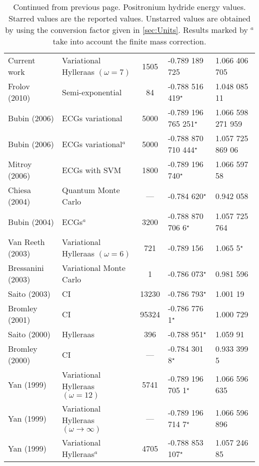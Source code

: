 \documentclass[Dissertation.tex]{subfiles}
\begin{document}
{\begin{center}
\begin{longtable}{l l c l l}
\caption[Positronium hydride energy values]{Continued from previous page. Positronium hydride energy values. Starred values are the reported values. Unstarred values are obtained by using the conversion factor given in \cref{sec:Units}. Results marked by $^a$ take into account the finite mass correction.}
\endlastfoot
\rowcolors{2}{gray!15}{white}
Current work & Variational Hylleraas $(\omega = 7)$ & 1505 & -0.789 189 725 & 1.066 406 705 \\
Frolov (2010) \cite{Frolov2010} & Semi-exponential & 84 & -0.788 516 419$^\star$ & 1.048 085 11 \\
Bubin (2006) \cite{Bubin2006} & ECGs variational & 5000 & -0.789 196 765 251$^\star$ & 1.066 598 271 959 \\
Bubin (2006) \cite{Bubin2006} & ECGs variational$^a$ & 5000 & -0.788 870 710 444$^\star$ & 1.057 725 869 06 \\
Mitroy (2006) \cite{Mitroy2006} & ECGs with SVM & 1800 & -0.789 196 740$^\star$ & 1.066 597 58 \\
Chiesa (2004) \cite{Chiesa2004} & Quantum Monte Carlo & --- & -0.784 620$^\star$ & 0.942 058 \\
Bubin (2004) \cite{Bubin2004} & ECGs$^a$ & 3200 & -0.788 870 706 6$^\star$ & 1.057 725 764 \\
Van Reeth (2003) \cite{VanReeth2003} & Variational Hylleraas $(\omega = 6)$ & 721 & -0.789 156 & 1.065 5$^\star$ \\
Bressanini (2003) \cite{Bressanini2003} & Variational Monte Carlo & 1 & -0.786 073$^\star$ & 0.981 596 \\
Saito (2003) \cite{Saito2003a} & CI & 13230 & -0.786 793$^\star$ & 1.001 19 \\
Bromley (2001) \cite{Bromley2001} & CI & 95324 & -0.786 776 1$^\star$ & 1.000 729 \\
Saito (2000) \cite{Saito2000} & Hylleraas & 396 & -0.788 951$^\star$ & 1.059 91 \\
Bromley (2000) \cite{Bromley2000} & CI & --- & -0.784 301 8$^\star$ & 0.933 399 5 \\
Yan (1999) \cite{Yan1999} & Variational Hylleraas $(\omega = 12)$ & 5741 & -0.789 196 705 1$^\star$ & 1.066 596 635 \\
Yan (1999) \cite{Yan1999} & Variational Hylleraas $(\omega \rightarrow \infty)$ & --- & -0.789 196 714 7$^\star$ & 1.066 596 896 \\
Yan (1999) \cite{Yan1999a} & Variational Hylleraas$^a$ & 4705 & -0.788 853 107$^\star$ & 1.057 246 85 \\

\end{longtable}
\end{center}}
\end{document}
